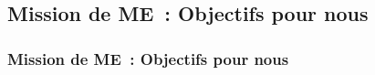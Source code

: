 \subsection{Mission de ME~: Objectifs pour nous}
\begin{frame}
	\frametitle{Mission de ME~: Objectifs pour nous}
\end{frame}
